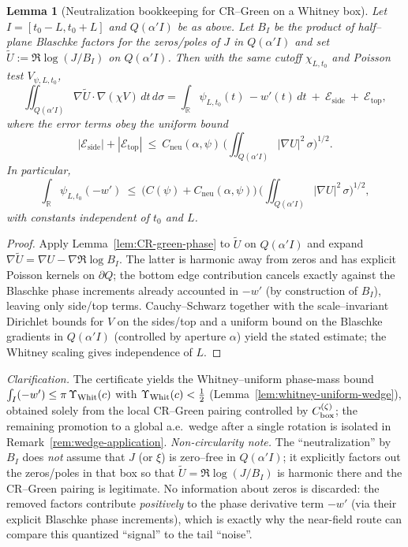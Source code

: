 \documentclass[11pt]{article}
\newtheorem{lemma}[theorem]{Lemma}
\theoremstyle{definition}
\theoremstyle{remark}
\theoremstyle{definition}
\newcommand{\R}{\mathbb{R}}
\begin{document}
\begin{lemma}[Neutralization bookkeeping for CR–Green on a Whitney box]\label{lem:neutralization-bookkeeping}
Let $I=[t_0{-}L,t_0{+}L]$ and $Q(\alpha'I)$ be as above. Let $B_I$ be the product of half–plane Blaschke factors for the zeros/poles of $J$ in $Q(\alpha'I)$ and set $\widetilde U:=\Re\log(J/B_I)$ on $Q(\alpha'I)$. Then with the same cutoff $\chi_{L,t_0}$ and Poisson test $V_{\psi,L,t_0}$,
\[
 \iint_{Q(\alpha'I)} \nabla \widetilde U\cdot\nabla(\chi V)\,dt\,d\sigma
 = \int_{\R} \psi_{L,t_0}(t)\,-w'(t)\,dt\ +\ \mathcal E_{\mathrm{side}}\ +\ \mathcal E_{\mathrm{top}},
\]
where the error terms obey the uniform bound
\[
 |\mathcal E_{\mathrm{side}}|+|\mathcal E_{\mathrm{top}}|
 \ \le\ C_{\mathrm{neu}}(\alpha,\psi)\,\Big(\iint_{Q(\alpha'I)} |\nabla U|^2\,\sigma\Big)^{1/2}.
\]
In particular,
\[
  \int_{\R} \psi_{L,t_0}(-w')\ \le\ \big(C(\psi)+C_{\mathrm{neu}}(\alpha,\psi)\big)\,\Big(\iint_{Q(\alpha'I)} |\nabla U|^2\,\sigma\Big)^{1/2},
\]
with constants independent of $t_0$ and $L$.
\end{lemma}
\begin{proof}
Apply Lemma~\ref{lem:CR-green-phase} to $\widetilde U$ on $Q(\alpha'I)$ and expand $\nabla\widetilde U=\nabla U-\nabla\Re\log B_I$. The latter is harmonic away from zeros and has explicit Poisson kernels on $\partial Q$; the bottom edge contribution cancels exactly against the Blaschke phase increments already accounted in $-w'$ (by construction of $B_I$), leaving only side/top terms. Cauchy–Schwarz together with the scale–invariant Dirichlet bounds for $V$ on the sides/top and a uniform bound on the Blaschke gradients in $Q(\alpha'I)$ (controlled by aperture $\alpha$) yield the stated estimate; the Whitney scaling gives independence of $L$.
\end{proof}
\noindent\emph{Clarification.} The certificate yields the Whitney–uniform phase-mass bound
\(\int_I (-w')\le \pi\,\Upsilon_{\rm Whit}(c)\) with $\Upsilon_{\rm Whit}(c)<\tfrac12$ (Lemma~\ref{lem:whitney-uniform-wedge}), obtained solely from the local CR--Green pairing controlled by $C_{\rm box}^{(\zeta)}$; the remaining promotion to a global a.e.\ wedge after a single rotation is isolated in Remark~\ref{rem:wedge-application}.
\smallskip
\noindent\emph{Non-circularity note.} The ``neutralization'' by \(B_I\) does \emph{not} assume that \(J\) (or \(\xi\)) is zero--free in \(Q(\alpha'I)\); it explicitly factors out the zeros/poles in that box so that \(\widetilde U=\Re\log(J/B_I)\) is harmonic there and the CR--Green pairing is legitimate.
No information about zeros is discarded: the removed factors contribute \emph{positively} to the phase derivative term \(-w'\) (via their explicit Blaschke phase increments), which is exactly why the near-field route can compare this quantized ``signal'' to the tail ``noise''.
\end{document}
